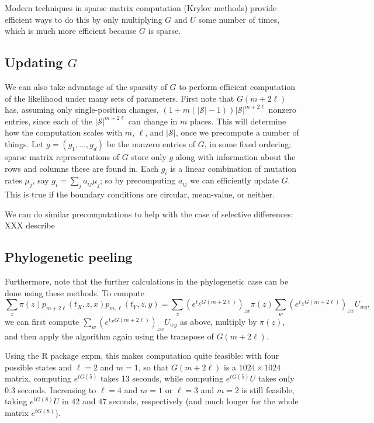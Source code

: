 \documentclass{article}
\newcommand{\calS}{\mathcal{S}}  %
\theoremstyle{plain}
\theoremstyle{definition}
\begin{document}
Modern techniques in sparse matrix computation (Krylov methods) provide efficient ways to do this
by only multiplying $G$ and $U$ some number of times,
which is much more efficient because $G$ is sparse.

\subsection{Updating $G$}

We can also take advantage of the sparsity of $G$ to perform efficient computation of the likelihood
under many sets of parameters.
First note that $G(m+2\ell)$ has, assuming only single-position changes,
$(1+m(|\calS|-1)) |\calS|^{m+2\ell}$ nonzero entries, since each of the $|\calS|^{m+2\ell}$ can change in $m$ places.
This will determine how the computation scales with $m$, $\ell$, and $|\calS|$,
once we precompute a number of things.
Let $g = (g_1, \ldots, g_d)$ be the nonzero entries of $G$, in some fixed ordering;
sparse matrix representations of $G$ store only $g$ along with information about the rows and columns these are found in.
Each $g_i$ is a linear combination of mutation rates $\mu_j$, say $g_i = \sum_j a_{ij} \mu_j$;
so by precomputing $a_{ij}$ we can efficiently update $G$.
This is true if the boundary conditions are circular, mean-value, or neither.

We can do similar precomputations to help with the case of selective differences:
XXX describe


\subsection{Phylogenetic peeling}

Furthermore, note that the further calculations in the phylogenetic case can be done using these methods.
To compute
\[
    \sum_z \pi(z) p_{m+2\ell}(t_X,z,x) p_{m,\ell}(t_Y,z,y)
    = \sum_z \left( e^{t_X G(m+2\ell)} \right)_{zx} \pi(z) \sum_w \left( e^{t_X G(m+2\ell)} \right)_{zw} U_{wy} ,
\]
we can first compute $\sum_w \left( e^{t_X G(m+2\ell)} \right)_{zw} U_{wy}$ as above,
multiply by $\pi(z)$, and then apply the algorithm again using the transpose of $G(m+2\ell)$.

Using the R package expm, this makes computation quite feasible:
with four possible states and $\ell=2$ and $m=1$, so that $G(m+2\ell)$ is a $1024 \times 1024$ matrix,
computing $e^{t G(5) }$ takes 13 seconds, while computing $e^{t G(5)} U$ takes only 0.3 seconds.
Increasing to $\ell=4$ and $m=1$ or $\ell=3$ and $m=2$ is still feasible, taking $e^{t G(8)} U$ in 42 and 47 seconds, respectively
(and much longer for the whole matrix $e^{t G(8)}$).
\end{document}
